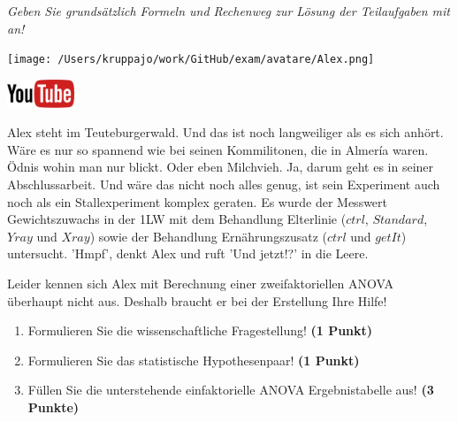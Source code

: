 \documentclass[a4paper, 9pt]{scrartcl}\usepackage[]{graphicx}\usepackage[]{xcolor}
\begin{document}
\textit{Geben Sie grundsätzlich Formeln und Rechenweg zur Lösung der Teilaufgaben mit an!} \\[1Ex]
 

 
\begin{minipage}[t]{0.5\textwidth}
\texttt{[image: /Users/kruppajo/work/GitHub/exam/avatare/Alex.png]}
\end{minipage}
\begin{minipage}[t]{0.5\textwidth}
\hfill
\href{https://youtu.be/8Pb2sKUIMyk}{\includegraphics[width = 2cm]{img/youtube}}\\[1Ex]
\end{minipage}
\vspace{1ex}



Alex steht im Teuteburgerwald. Und das ist noch langweiliger als es sich anhört. Wäre es nur so spannend wie bei seinen Kommilitonen, die in Almería waren. Ödnis wohin man nur blickt. Oder eben Milchvieh. Ja, darum geht es in seiner Abschlussarbeit. Und wäre das nicht noch alles genug, ist sein Experiment auch noch als ein Stallexperiment komplex geraten. Es wurde der Messwert Gewichtszuwachs in der 1LW mit dem Behandlung Elterlinie ($ctrl$, $Standard$, $Yray$ und $Xray$) sowie der Behandlung Ernährungszusatz ($ctrl$ und $getIt$) untersucht. 'Hmpf', denkt Alex und ruft 'Und jetzt!?' in die Leere.



\vspace{1ex}

Leider kennen sich Alex mit Berechnung einer zweifaktoriellen ANOVA überhaupt nicht aus. Deshalb braucht er bei der Erstellung Ihre Hilfe! 

\begin{enumerate}
  \item Formulieren Sie die wissenschaftliche Fragestellung! \textbf{(1 Punkt)}
  \item Formulieren Sie das statistische Hypothesenpaar! \textbf{(1 Punkt)}
\item Füllen Sie die unterstehende einfaktorielle ANOVA Ergebnistabelle aus! \textbf{(3 Punkte)}
\end{enumerate}
\end{document}
